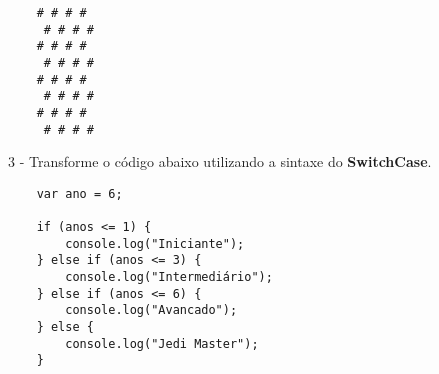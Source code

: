 	\begin{lstlisting}
	# # # #
	 # # # #
	# # # #
	 # # # #
	# # # #
	 # # # #
	# # # #
	 # # # #
	\end{lstlisting}

3 - Transforme o código abaixo utilizando a sintaxe do \textbf{SwitchCase}.

\begin{lstlisting}
	var ano = 6;

	if (anos <= 1) {
		console.log("Iniciante");
	} else if (anos <= 3) {
		console.log("Intermediário");
	} else if (anos <= 6) {
		console.log("Avancado");
	} else {
		console.log("Jedi Master");
	}
\end{lstlisting}



